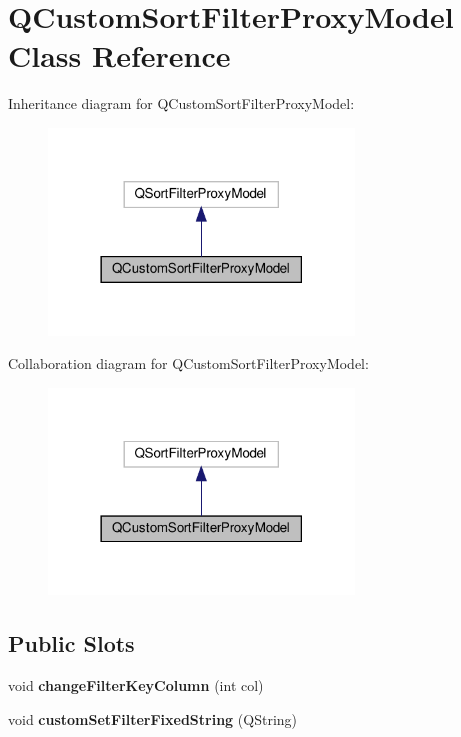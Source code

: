 \hypertarget{class_q_custom_sort_filter_proxy_model}{}\section{Q\+Custom\+Sort\+Filter\+Proxy\+Model Class Reference}
\label{class_q_custom_sort_filter_proxy_model}


Inheritance diagram for Q\+Custom\+Sort\+Filter\+Proxy\+Model\+:\nopagebreak
\begin{figure}[H]
\begin{center}
\leavevmode
\includegraphics[width=230pt]{class_q_custom_sort_filter_proxy_model__inherit__graph}
\end{center}
\end{figure}


Collaboration diagram for Q\+Custom\+Sort\+Filter\+Proxy\+Model\+:\nopagebreak
\begin{figure}[H]
\begin{center}
\leavevmode
\includegraphics[width=230pt]{class_q_custom_sort_filter_proxy_model__coll__graph}
\end{center}
\end{figure}
\subsection*{Public Slots}
\begin{DoxyCompactItemize}
\item 
\mbox{\label{class_q_custom_sort_filter_proxy_model_a32c931f0e638bb0f34090fd6beb622c8}} 
void {\bfseries change\+Filter\+Key\+Column} (int col)
\item 
\mbox{\label{class_q_custom_sort_filter_proxy_model_ace5bb8380d35be434b27a12afb10fd95}} 
void {\bfseries custom\+Set\+Filter\+Fixed\+String} (Q\+String)
\end{DoxyCompactItemize}
